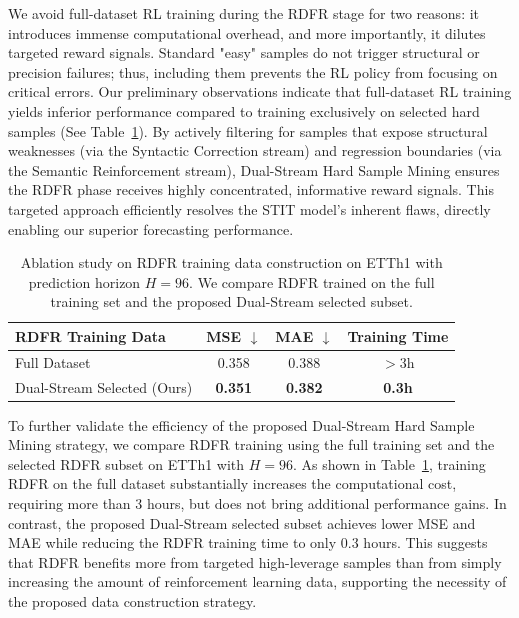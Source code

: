 We avoid full-dataset RL training during the RDFR stage for two reasons: it introduces immense computational overhead, and more importantly, it dilutes targeted reward signals. Standard "easy" samples do not trigger structural or precision failures; thus, including them prevents the RL policy from focusing on critical errors. Our preliminary observations indicate that full-dataset RL training yields inferior performance compared to training exclusively on selected hard samples (See Table~\ref{tab:rdfr_data_construction_ablation}). By actively filtering for samples that expose structural weaknesses (via the Syntactic Correction stream) and regression boundaries (via the Semantic Reinforcement stream), Dual-Stream Hard Sample Mining ensures the RDFR phase receives highly concentrated, informative reward signals. This targeted approach efficiently resolves the STIT model's inherent flaws, directly enabling our superior forecasting performance.

\begin{table}[htbp]
\centering
\small
\caption{Ablation study on RDFR training data construction on ETTh1 with prediction horizon $H=96$. We compare RDFR trained on the full training set and the proposed Dual-Stream selected subset.}
\label{tab:rdfr_data_construction_ablation}
\setlength{\tabcolsep}{10pt}
\begin{tabular}{lccc}
\toprule
\textbf{RDFR Training Data} & \textbf{MSE} $\downarrow$ & \textbf{MAE} $\downarrow$ & \textbf{Training Time} \\
\midrule
Full Dataset & 0.358 & 0.388 & $>3$h \\
Dual-Stream Selected (Ours) & \textbf{0.351} & \textbf{0.382} & \textbf{0.3h} \\
\bottomrule
\end{tabular}
\end{table}

To further validate the efficiency of the proposed Dual-Stream Hard Sample Mining strategy, we compare RDFR training using the full training set and the selected RDFR subset on ETTh1 with $H=96$. As shown in Table~\ref{tab:rdfr_data_construction_ablation}, training RDFR on the full dataset substantially increases the computational cost, requiring more than 3 hours, but does not bring additional performance gains. In contrast, the proposed Dual-Stream selected subset achieves lower MSE and MAE while reducing the RDFR training time to only 0.3 hours. This suggests that RDFR benefits more from targeted high-leverage samples than from simply increasing the amount of reinforcement learning data, supporting the necessity of the proposed data construction strategy.
